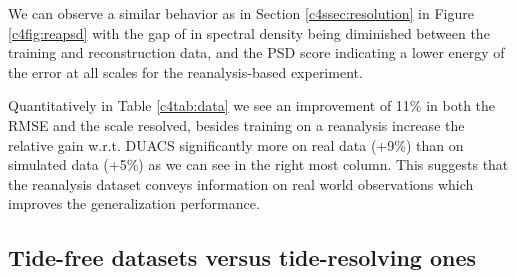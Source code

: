 \begin{bibunit}
We can observe a similar behavior as in Section \ref{c4ssec:resolution} in Figure \ref{c4fig:reapsd} with the gap of in spectral density being diminished between the training and reconstruction data, and the PSD score indicating a lower energy of the error at all scales for the reanalysis-based experiment.

Quantitatively in Table \ref{c4tab:data} we see an improvement of 11\% in both the RMSE and the scale resolved, besides training on a reanalysis increase the relative gain w.r.t. DUACS significantly more on real data (+9\%) than on simulated data (+5\%) as we can see in the right most column. This suggests that the reanalysis dataset conveys information on real world observations which improves the generalization performance.

\subsection{Tide-free datasets versus tide-resolving ones}
\label{c4ssec:tide}







\end{bibunit}
